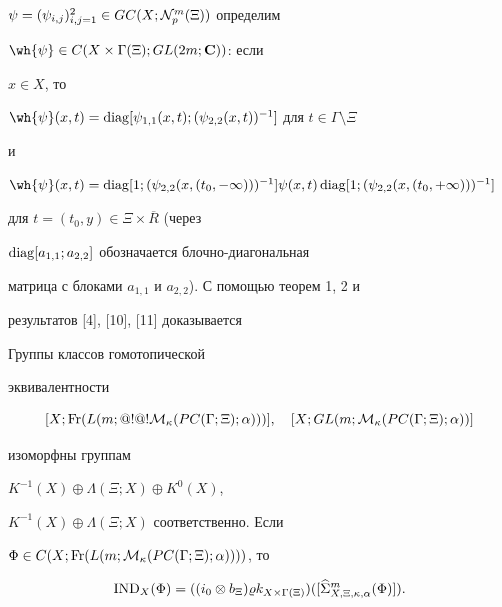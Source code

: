 $\psi =(\psi_{i,j})_{i,j=1}^2\in GC(X;{\cal N}_p^m(\Xi))$ определим


$\wh{\psi}\in C(X\times\Gamma (\Xi);GL(2m;{\bold C}))$: если


$x\in X$, то


$\wh{\psi}(x,t)=\diag[\psi_{1,1}(x,t);


(\psi_{2,2}(x,t))^{-1}]$ для $t\in\Gamma\setminus\Xi$


и


$\wh{\psi}(x,t)=\diag[1;(\psi_{2,2}(x,(t_0,-\infty)))^{-1}]


\psi (x,t)\diag[1;(\psi_{2,2}(x,(t_0,+\infty)))^{-1}]$


для $t=(t_0,y)\in\Xi\times\overline{R}$ (через


$\operatorname{diag}[a_{1,1};a_{2,2}]$ обозначается блочно-диагональная


матрица с блоками $a_{1,1}$ и $a_{2,2}$). С помощью теорем 1, 2 и


результатов [4], [10], [11] доказывается





\begin{thm}


Группы классов гомотопической


эквивалентности


$$


[X;\Fr(L(m;@!@!{\cal M}_\kappa (PC(\Gamma ;


\Xi);\alpha)))],\quad [X;GL(m;{\cal M}_\kappa (PC(\Gamma ;


\Xi);\alpha))]


$$


изоморфны группам


$K^{-1}(X)\oplus\Lambda (\Xi ;X)\oplus K^0(X)$,


$K^{-1}(X)\oplus\Lambda (\Xi ;X)$ соответственно. Если


$\Phi\in C(X;\Fr(L(m;{\cal M}_\kappa (PC(\Gamma ;\Xi);


\alpha))))$, то


$$


\IND_X(\Phi)=((i_0\otimes b_\Xi)


\varrho k_{X\times\Gamma (\Xi)})([\widehat{\Sigma}^m_


{X,\Xi,\kappa,\alpha}(\Phi)]).


$$


\end{thm}








